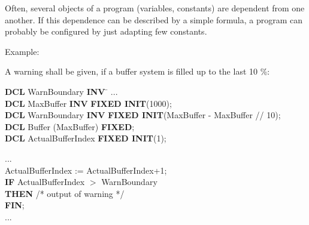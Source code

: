 \begin{tobedone}
Often, several objects of a program (variables, constants) are dependent
from one another. If this dependence can be described by a simple
formula, a program can probably be configured by just adapting few
constants.

Example:

A warning shall be given, if a buffer system is filled up to the last 10
\%:

\begin{tabbing}
{\bf DCL} WarnBoundary \= {\bf INV} \= \kill
... \> \> \\
{\bf DCL} MaxBuffer    \> {\bf INV} \> {\bf FIXED INIT}(1000); \\
{\bf DCL} WarnBoundary \> {\bf INV} \> {\bf FIXED INIT}(MaxBuffer - MaxBuffer // 10);\\
{\bf DCL} Buffer (MaxBuffer) \>     \> {\bf FIXED};\\
{\bf DCL} ActualBufferIndex \>     \> {\bf FIXED INIT}(1);
\end{tabbing}
... \\
ActualBufferIndex := ActualBufferIndex+1;\\
{\bf IF} ActualBufferIndex $>$ WarnBoundary\\
{\bf THEN} /* output of warning */ \\
{\bf FIN};\\
...
\end{tobedone}

